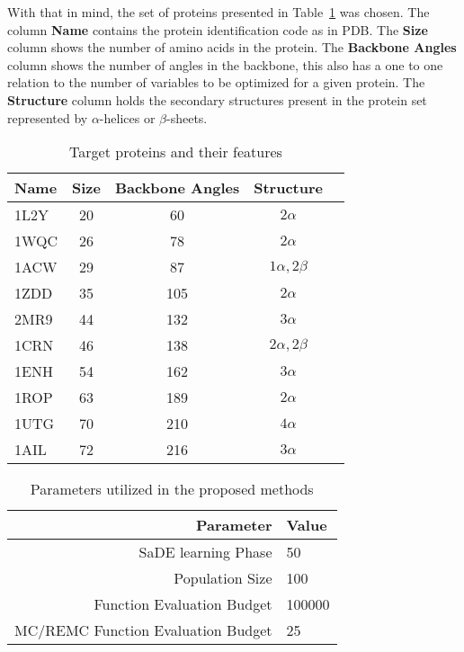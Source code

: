 With that in mind, the set of proteins presented in Table~\ref{tab:protein-targets}
was chosen. The column \textbf{Name} contains the protein identification code
as in PDB.  The \textbf{Size} column shows the number of amino acids in the protein.
The \textbf{Backbone Angles} column shows the number of angles in the backbone,
this also has a one to one relation to the number of variables to be optimized
for a given protein. The \textbf{Structure} column holds the secondary
structures present in the protein set represented by $\alpha$-helices or
$\beta$-sheets.

\begin{table}[bh]
  \centering
  \begin{tabular}{ l | c | c | c | c }
    \hline \hline
    Name & Size & Backbone Angles & Structure         \\ \hline \hline
    1L2Y & 20   & 60              & $2\alpha$         \\ \hline
    1WQC & 26   & 78              & $2\alpha$         \\ \hline
    1ACW & 29   & 87              & $1\alpha, 2\beta$ \\ \hline
    1ZDD & 35   & 105             & $2\alpha$         \\ \hline
    2MR9 & 44   & 132             & $3\alpha$         \\ \hline
    1CRN & 46   & 138             & $2\alpha, 2\beta$ \\ \hline
    1ENH & 54   & 162             & $3\alpha$         \\ \hline
    1ROP & 63   & 189             & $2\alpha$         \\ \hline
    1UTG & 70   & 210             & $4\alpha$         \\ \hline
    1AIL & 72   & 216             & $3\alpha$         \\ \hline
    \hline
  \end{tabular}
  \caption{Target proteins and their features}
  \label{tab:protein-targets}
\end{table}




\begin{table}[ht]
    \centering
    \begin{tabular}{r|l} \hline \hline
        Parameter & Value \\ \hline \hline
        SaDE learning Phase & 50 \\ \hline
        Population Size & 100 \\ \hline
        Function Evaluation Budget & 100000 \\ \hline
        MC/REMC Function Evaluation Budget & 25 \\ \hline \hline
    \end{tabular}
    \caption{Parameters utilized in the proposed methods}
    \label{tab:parameters}
\end{table}

